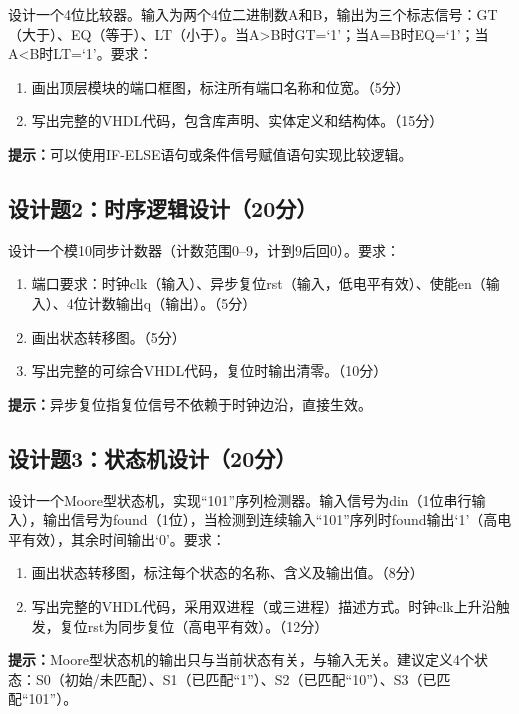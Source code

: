 设计一个4位比较器。输入为两个4位二进制数A和B，输出为三个标志信号：GT（大于）、EQ（等于）、LT（小于）。当A>B时GT=‘1’；当A=B时EQ=‘1’；当A<B时LT=‘1’。要求：

\begin{enumerate}[label=(\arabic*)]
  \item 画出顶层模块的端口框图，标注所有端口名称和位宽。（5分）
  \item 写出完整的VHDL代码，包含库声明、实体定义和结构体。（15分）
\end{enumerate}

\begin{framed}
\textbf{提示：}可以使用IF-ELSE语句或条件信号赋值语句实现比较逻辑。
\end{framed}

\subsection*{设计题2：时序逻辑设计（20分）}

设计一个模10同步计数器（计数范围0--9，计到9后回0）。要求：

\begin{enumerate}[label=(\arabic*)]
  \item 端口要求：时钟clk（输入）、异步复位rst（输入，低电平有效）、使能en（输入）、4位计数输出q（输出）。（5分）
  \item 画出状态转移图。（5分）
  \item 写出完整的可综合VHDL代码，复位时输出清零。（10分）
\end{enumerate}

\begin{framed}
\textbf{提示：}异步复位指复位信号不依赖于时钟边沿，直接生效。
\end{framed}

\subsection*{设计题3：状态机设计（20分）}

设计一个Moore型状态机，实现“101”序列检测器。输入信号为din（1位串行输入），输出信号为found（1位），当检测到连续输入“101”序列时found输出‘1’（高电平有效），其余时间输出‘0’。要求：

\begin{enumerate}[label=(\arabic*)]
  \item 画出状态转移图，标注每个状态的名称、含义及输出值。（8分）
  \item 写出完整的VHDL代码，采用双进程（或三进程）描述方式。时钟clk上升沿触发，复位rst为同步复位（高电平有效）。（12分）
\end{enumerate}

\begin{framed}
\textbf{提示：}Moore型状态机的输出只与当前状态有关，与输入无关。建议定义4个状态：S0（初始/未匹配）、S1（已匹配“1”）、S2（已匹配“10”）、S3（已匹配“101”）。
\end{framed}
